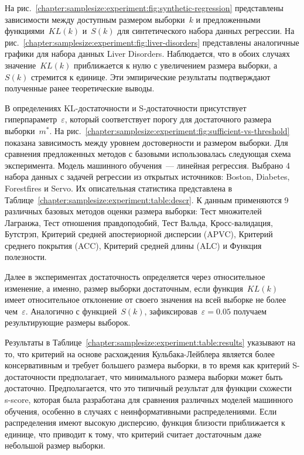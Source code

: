 На рис.~\ref{chapter:samplesize:experiment:fig:synthetic-regression} представлены зависимости между доступным размером выборки~$k$ и предложенными функциями~$KL(k)$ и~$S(k)$ для синтетического набора данных регрессии.
На рис.~\ref{chapter:samplesize:experiment:fig:liver-disorders} представлены аналогичные графики для набора данных Liver Disorders.
Наблюдается, что в обоих случаях значение~$KL(k)$ приближается к нулю с увеличением размера выборки, а~$S(k)$ стремится к единице.
Эти эмпирические результаты подтверждают полученные ранее теоретические выводы.

В определениях KL-достаточности и S-достаточности присутствует гиперпараметр~$\varepsilon$, который соответствует порогу для достаточного размера выборки~$m^*$.
На рис.~\ref{chapter:samplesize:experiment:fig:sufficient-vs-threshold} показана зависимость между уровнем достоверности и размером выборки.
Для сравнения предложенных методов с базовыми использовалась следующая схема эксперимента.
Модель машинного обучения~--- линейная регрессия.
Выбрано 4 набора данных с задачей регрессии из открытых источников: Boston, Diabetes, Forestfires и Servo.
Их описательная статистика представлена в Таблице~\ref{chapter:samplesize:experiment:table:descr}.
К данным применяются 9 различных базовых методов оценки размера выборки: Тест множителей Лагранжа, Тест отношения правдоподобий, Тест Вальда, Кросс-валидация, Бутстрэп, Критерий средней апостериорной дисперсии (APVC), Критерий среднего покрытия (ACC), Критерий средней длины (ALC) и Функция полезности.

Далее в экспериментах достаточность определяется через относительное изменение, а именно, размер выборки достаточным, если функция~$KL(k)$ имеет относительное отклонение от своего значения на всей выборке не более чем~$\varepsilon$.
Аналогично с функцией~$S(k)$, зафиксировав~$\varepsilon=0.05$ получаем результирующие размеры выборок.

Результаты в Таблице~\ref{chapter:samplesize:experiment:table:results} указывают на то, что критерий на основе расхождения Кульбака-Лейблера является более консервативным и требует большего размера выборки, в то время как критерий S-достаточности предполагает, что минимального размера выборки может быть достаточно.
Предполагается, что это типичный результат для функции схожести s-score, которая была разработана для сравнения различных моделей машинного обучения, особенно в случаях с неинформативными распределениями.
Если распределения имеют высокую дисперсию, функция близости приближается к единице, что приводит к тому, что критерий считает достаточным даже небольшой размер выборки.

